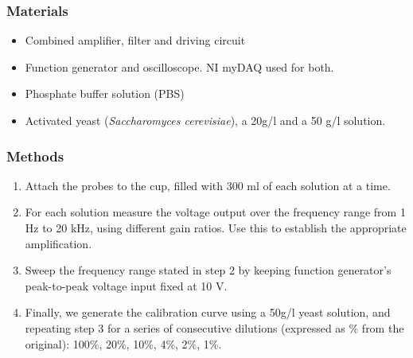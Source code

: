 \subsubsection{Materials}
\begin{itemize}
	\item Combined amplifier, filter and driving circuit
	\item Function generator and oscilloscope. NI myDAQ used for both.
	\item Phosphate buffer solution (PBS)
	\item Activated yeast (\textit{Saccharomyces cerevisiae}), a 20g/l and a 50 g/l solution.
\end{itemize}

\subsubsection{Methods} \label{sec:Impedance-Method}
\begin{enumerate}
	\item Attach the probes to the cup, filled with 300 ml of each solution at a time.
	\item For each solution measure the voltage output over the frequency range from 1 Hz to 20 kHz, using different gain ratios. Use this to establish the appropriate amplification.
	\item Sweep the frequency range stated in step 2 by keeping function generator's peak-to-peak voltage input fixed at 10 V.
	\item Finally, we generate the calibration curve using a 50g/l yeast solution, and repeating step 3 for a series of consecutive dilutions (expressed as \% from the original): 100\%, 20\%, 10\%, 4\%, 2\%, 1\%. 
\end{enumerate}
